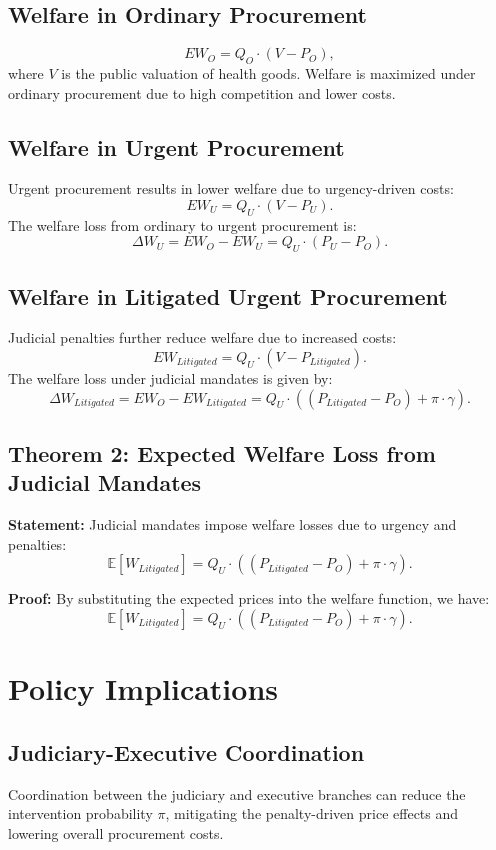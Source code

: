 \documentclass[12pt]{article}
\begin{document}
\subsection{Welfare in Ordinary Procurement}
\[
EW_O = Q_O \cdot (V - P_O),
\]
where \( V \) is the public valuation of health goods. Welfare is maximized under ordinary procurement due to high competition and lower costs.

\subsection{Welfare in Urgent Procurement}
Urgent procurement results in lower welfare due to urgency-driven costs:
\[
EW_U = Q_U \cdot (V - P_U).
\]
The welfare loss from ordinary to urgent procurement is:
\[
\Delta W_U = EW_O - EW_U = Q_U \cdot (P_U - P_O).
\]

\subsection{Welfare in Litigated Urgent Procurement}
Judicial penalties further reduce welfare due to increased costs:
\[
EW_{Litigated} = Q_U \cdot (V - P_{Litigated}).
\]
The welfare loss under judicial mandates is given by:
\[
\Delta W_{Litigated} = EW_O - EW_{Litigated} = Q_U \cdot ((P_{Litigated} - P_O) + \pi \cdot \gamma).
\]

\subsection{Theorem 2: Expected Welfare Loss from Judicial Mandates}

\textbf{Statement:} Judicial mandates impose welfare losses due to urgency and penalties:
\[
\mathbb{E}[W_{Litigated}] = Q_U \cdot \left((P_{Litigated} - P_O) + \pi \cdot \gamma \right).
\]

\textbf{Proof:} By substituting the expected prices into the welfare function, we have:
\[
\mathbb{E}[W_{Litigated}] = Q_U \cdot ((P_{Litigated} - P_O) + \pi \cdot \gamma).
\]

\section{Policy Implications}

\subsection{Judiciary-Executive Coordination}
Coordination between the judiciary and executive branches can reduce the intervention probability \( \pi \), mitigating the penalty-driven price effects and lowering overall procurement costs.
\end{document}
